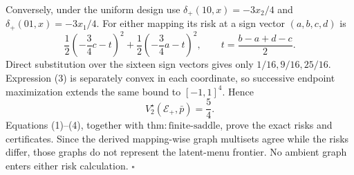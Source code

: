 Conversely, under the uniform design use \(\delta_+(10,x)=-3x_2/4\) and \(\delta_+(01,x)=-3x_1/4\). For either mapping its risk at a sign vector \((a,b,c,d)\) is
\[
 \frac12\left(-\frac34c-t\right)^2
 +\frac12\left(-\frac34a-t\right)^2,
 \qquad t=\frac{b-a+d-c}{2}. \tag{3}
\]
Direct substitution over the sixteen sign vectors gives only \(1/16,9/16,25/16\). Expression (3) is separately convex in each coordinate, so successive endpoint maximization extends the same bound to \([-1,1]^4\). Hence
\[
 V_2^\star(\mathcal E_+,\bar p)=\frac54. \tag{4}
\]
Equations (1)--(4), together with \(\mathrm{thm{:}finite\text{-}saddle}\), prove the exact risks and certificates. Since the derived mapping-wise graph multisets agree while the risks differ, those graphs do not represent the latent-menu frontier. No ambient graph enters either risk calculation. \(\square\)